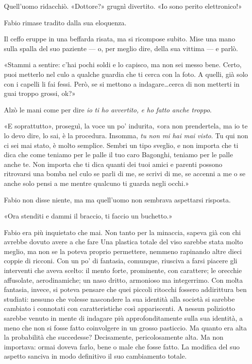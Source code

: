 Quell'uomo ridacchiò. «Dottore?» grugnì divertito. «Io sono perito elettronico!» 

Fabio rimase tradito dalla sua eloquenza.

Il ceffo eruppe in una beffarda risata, ma si ricompose subito. Mise una mano sulla spalla del suo paziente --- o, per meglio dire, della sua vittima --- e parlò.

«Stammi a sentire: c'hai pochi soldi e lo capisco, ma non sei messo bene. Certo, puoi metterlo nel culo a qualche guardia che ti cerca con la foto. A quelli, già solo con i capelli li fai fessi. Però, se si mettono a indagare\ldots \thinspace cerca di non metterti in guai troppo grossi, ok?»

Alzò le mani come per dire \textit{io ti ho avvertito, e ho fatto anche troppo}.

«E soprattutto», proseguì, la voce un po' indurita, «ora non prendertela, ma io te lo devo dire, lo sai, è la procedura. Insomma, \textit{tu non mi hai mai visto}. Tu qui non ci sei mai stato, è molto semplice. Sembri un tipo sveglio, e non importa che ti dica che come teniamo per le palle il tuo caro Bagonghi, teniamo per le palle anche te. Non importa che ti dica quanti dei tuoi amici e parenti possono ritrovarsi una bomba nel culo se parli di me, se scrivi di me, se accenni a me o se anche solo pensi a me mentre qualcuno ti guarda negli occhi.»

Fabio non disse niente, ma ma quell'uomo non sembrava aspettarsi risposta.

«Ora stenditi e dammi il braccio, ti faccio un buchetto.»

Fabio era più inquietato che mai. Non tanto per la minaccia, sapeva già con chi avrebbe dovuto avere a che fare Una plastica totale del viso sarebbe stata molto meglio, ma non se la poteva proprio permettere, nemmeno rapinando altre dieci coppie di ricconi. Con un po' di fantasia, comunque, riusciva a farsi piacere gli interventi che aveva scelto: il mento forte, prominente, con carattere; le orecchie affusolate, aerodinamiche; un naso dritto, armonioso ma integerrimo. Con molta fantasia, invece, si poteva pensare che quei piccoli ritocchi fossero addirittura ben studiati: nessuno che volesse nascondere la sua identità alla società si sarebbe cambiato i connotati con caratteristiche così appariscenti. A nessun poliziotto sarebbe venuto in mente di indagare più approfonditamente sulla sua identità, a meno che non si fosse fatto coinvolgere in un grosso pasticcio. Ma quanto era alta la probabilità che succedesse? Decisamente, pericolosamente alta. Ma non importava: ormai doveva farlo, bene o male che fosse fatto. La modifica del suo aspetto sanciva in modo definitivo il suo cambiamento totale.

